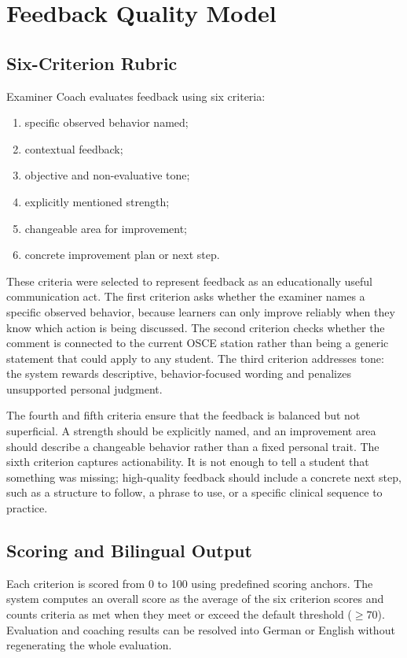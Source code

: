 \section{Feedback Quality Model}

\subsection{Six-Criterion Rubric}
Examiner Coach evaluates feedback using six criteria:
\begin{enumerate}
    \item specific observed behavior named;
    \item contextual feedback;
    \item objective and non-evaluative tone;
    \item explicitly mentioned strength;
    \item changeable area for improvement;
    \item concrete improvement plan or next step.
\end{enumerate}

These criteria were selected to represent feedback as an educationally useful
communication act. The first criterion asks whether the examiner names a
specific observed behavior, because learners can only improve reliably when they
know which action is being discussed. The second criterion checks whether the
comment is connected to the current OSCE station rather than being a generic
statement that could apply to any student. The third criterion addresses tone:
the system rewards descriptive, behavior-focused wording and penalizes
unsupported personal judgment.

The fourth and fifth criteria ensure that the feedback is balanced but not
superficial. A strength should be explicitly named, and an improvement area
should describe a changeable behavior rather than a fixed personal trait. The
sixth criterion captures actionability. It is not enough to tell a student that
something was missing; high-quality feedback should include a concrete next
step, such as a structure to follow, a phrase to use, or a specific clinical
sequence to practice.

\subsection{Scoring and Bilingual Output}
Each criterion is scored from 0 to 100 using predefined scoring anchors. The
system computes an overall score as the average of the six criterion scores and
counts criteria as met when they meet or exceed the default threshold
(\(\geq 70\)). Evaluation and coaching results can be resolved into German or
English without regenerating the whole evaluation.

